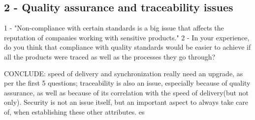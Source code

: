   \subsection*{2 - Quality assurance and traceability issues}

1 - "Non-compliance with certain standards is a big issue that affects the reputation of companies working with sensitive products."
2 - In your experience, do you think that compliance with quality standards would be easier to achieve if all the products were traced as well as the processes they go through?


CONCLUDE: speed of delivery and synchronization really need an upgrade, as per the first 5 questions; traceability is also an issue, especially because of quality assurance, as well as because of its correlation with the speed of delivery(but not only). Security is not an issue itself, but an important aspect to always take care of, when establishing these other attributes. es